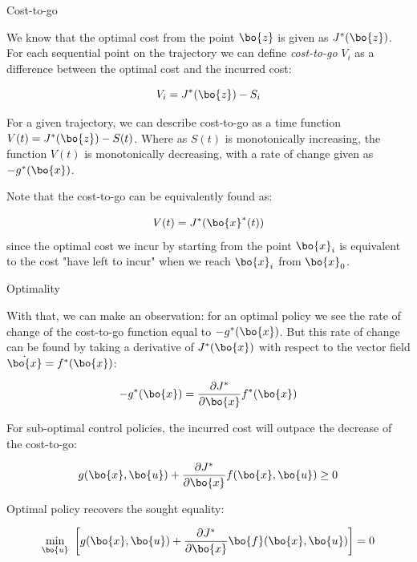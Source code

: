\documentclass{beamer}
\begin{document}
\begin{frame}{Cost-to-go}
	\begin{flushleft}
		
		We know that the optimal cost from the point $\bo{z}$ is given as $J^*(\bo{z})$. For each sequential point on the trajectory we can define \emph{cost-to-go} $V_i$ as a difference between the optimal cost and the incurred cost:
		
		\begin{equation}
			V_i = J^*(\bo{z}) - S_i
		\end{equation}
		
		For a given trajectory, we can describe cost-to-go as a time function $V(t) = J^*(\bo{z}) - S(t)$. Where as $S(t)$ is monotonically increasing, the function $V(t)$ is monotonically decreasing, with a rate of change given as $-g^*(\bo{x})$.
		
		\bigskip
		
		Note that the cost-to-go can be equivalently found as:
		
		\begin{equation}
			V(t) = J^*(\bo{x}^*(t))
		\end{equation}
		since the optimal cost we incur by starting from the point $\bo{x}_i$ is equivalent to the cost "have left to incur" when we reach $\bo{x}_i$ from $\bo{x}_0$.
		
	\end{flushleft}
\end{frame}


\begin{frame}{Optimality}
	\begin{flushleft}
		
		With that, we can make an observation: for an optimal policy we see the rate of change of the cost-to-go function equal to $-g^*(\bo{x})$. But this rate of change can be found by taking a derivative of $J^*(\bo{x})$ with respect to the vector field $\dot{\bo{x}} = f^*(\bo{x})$:
		
		\begin{equation}
			-g^*(\bo{x}) = \frac{\partial J^*}{\partial \bo{x}} f^*(\bo{x})
		\end{equation}
		
		For sub-optimal control policies, the incurred cost will outpace the decrease of the cost-to-go:
		
		\begin{equation}
			g(\bo{x}, \bo{u}) + \frac{\partial J^*}{\partial \bo{x}} f(\bo{x}, \bo{u}) \geq 0
		\end{equation}
		
		Optimal policy recovers the sought equality:
		
		\begin{equation}
			\underset{\bo{u}}{\min} \ 
			\left[ 
			g(\bo{x}, \bo{u}) + 
			\frac{\partial J^*}{\partial \bo{x}} \bo{f} (\bo{x}, \bo{u}) 
			\right] = 0
		\end{equation}
		
	\end{flushleft}
\end{frame}
\end{document}
